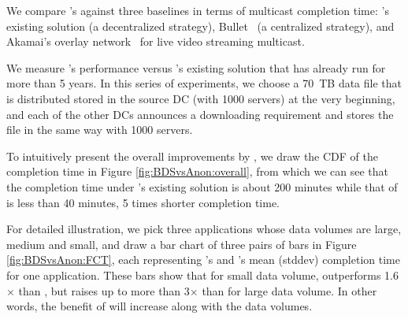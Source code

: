 We compare \name's against three baselines in terms of 
multicast completion time:
\company's existing solution (a decentralized strategy),
Bullet~\cite{??} (a centralized strategy), and 
Akamai's overlay network~\cite{??} for live video streaming
multicast.






We measure \name's performance versus \company's existing solution that has already run for more than 5 years. In this series of experiments, we choose a 70~TB data file that is distributed stored in the source DC (with 1000 servers) at the very beginning, and each of the other DCs announces a downloading requirement and stores the file in the same way with 1000 servers.


To intuitively present the overall improvements by \name, we draw the CDF of the completion time in Figure \ref{fig:BDSvsAnon:overall}, from which we can see that the completion time under \company's existing solution is about 200 minutes while that of \name is less than 40 minutes, 5 times shorter completion time.

For detailed illustration, we pick three applications whose data volumes are large, medium and small, and draw a bar chart of three pairs of bars in Figure \ref{fig:BDSvsAnon:FCT}, each representing \name's and \company's mean (stddev) completion time for one application. These bars show that for small data volume, \name outperforms 1.6$\times$ than \company, but raises up to more than 3$\times$ than \company for large data volume. In other words, the benefit of \name will increase along with the data volumes.

